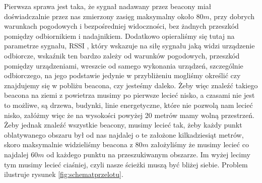 Pierwsza sprawa jest taka, że sygnał nadawany przez beacony miał doświadczalnie przez nas zmierzony zasięg maksymalny około $80 m$, przy dobrych warunkach pogodowych i bezpośredniej widoczności, bez żadnych przeszkód pomiędzy odbiornikiem i nadajnikiem. Dodatkowo opieraliśmy się tutaj na parametrze sygnału, RSSI \cite{rssi}, który wskazuje na siłę sygnału jaką widzi urządzenie odbiorcze, wskaźnik ten bardzo zależy od warunków pogodowych, przeszkód pomiędzy urządzeniami, wreszcie od samego wykonania urządzeń, szczególnie odbiorczego, na jego podstawie jedynie w przybliżeniu mogliśmy określić czy znajdujemy się w pobliżu beacona, czy jesteśmy daleko. Żeby więc znaleźć takiego beacona na ziemi z powietrza musimy po pierwsze lecieć nisko, a czasami nie jest to możliwe, są drzewa, budynki, linie energetyczne, które nie pozwolą nam lecieć nisko, załóżmy więc że na wysokości powyżej 20 metrów mamy wolną przestrzeń. Żeby jednak znaleźć wszystkie beacony, musimy lecieć tak, żeby każdy punkt oblatywanego obszaru był od nas najdalej o te założone kilkadziesiąt metrów, skoro maksymalnie widzieliśmy beacona z $80 m$ założyliśmy że musimy lecieć co najdalej $60 m$ od każdego punktu na przeszukiwanym obszarze. Im wyżej lecimy tym musimy lecieć ciaśniej, czyli nasze ścieżki muszą być bliżej siebie. Problem ilustruje rysunek \ref{fig:schematprzelotu}.

